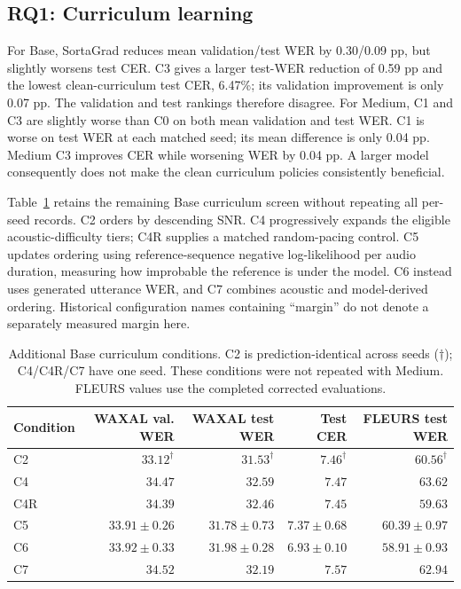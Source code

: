 \documentclass[12pt,a4paper]{report}
\begin{document}
\subsection{RQ1: Curriculum learning}

For Base, SortaGrad reduces mean validation/test WER by 0.30/0.09 pp, but
slightly worsens test CER. C3 gives a larger test-WER reduction of 0.59 pp
and the lowest clean-curriculum test CER, 6.47\%; its validation improvement
is only 0.07 pp. The validation and test rankings therefore disagree.
For Medium, C1 and C3 are slightly worse than C0 on both mean validation
and test WER. C1 is worse on test WER at each matched seed; its mean
difference is only 0.04 pp. Medium C3 improves CER while worsening WER by
0.04 pp. A larger model consequently does not make the clean curriculum
policies consistently beneficial.

Table~\ref{tab:base-screen} retains the remaining Base curriculum screen
without repeating all per-seed records. C2 orders by descending SNR. C4
progressively expands the eligible acoustic-difficulty tiers; C4R supplies
a matched random-pacing control. C5 updates ordering using reference-sequence
negative log-likelihood per audio duration, measuring how improbable the
reference is under the model. C6 instead uses generated utterance WER, and
C7 combines acoustic and model-derived ordering. Historical configuration
names containing ``margin'' do not denote a separately measured margin here.

\begin{table}[htbp]\centering\small
\caption{Additional Base curriculum conditions. C2 is prediction-identical
across seeds ($\dagger$); C4/C4R/C7 have one seed. These conditions were not
repeated with Medium. FLEURS values use the completed corrected evaluations.}
\label{tab:base-screen}
\begin{tabular}{lrrrr}\toprule
Condition & WAXAL val. WER & WAXAL test WER & Test CER & FLEURS test WER\\\midrule
C2 & $33.12^{\dagger}$ & $31.53^{\dagger}$ & $7.46^{\dagger}$ & $60.56^{\dagger}$ \\
C4 & $34.47$ & $32.59$ & $7.47$ & $63.62$ \\
C4R & $34.39$ & $32.46$ & $7.45$ & $59.63$ \\
C5 & $33.91 \pm 0.26$ & $31.78 \pm 0.73$ & $7.37 \pm 0.68$ & $60.39 \pm 0.97$ \\
C6 & $33.92 \pm 0.33$ & $31.98 \pm 0.28$ & $6.93 \pm 0.10$ & $58.91 \pm 0.93$ \\
C7 & $34.52$ & $32.19$ & $7.57$ & $62.94$ \\
\bottomrule\end{tabular}\end{table}
\end{document}
